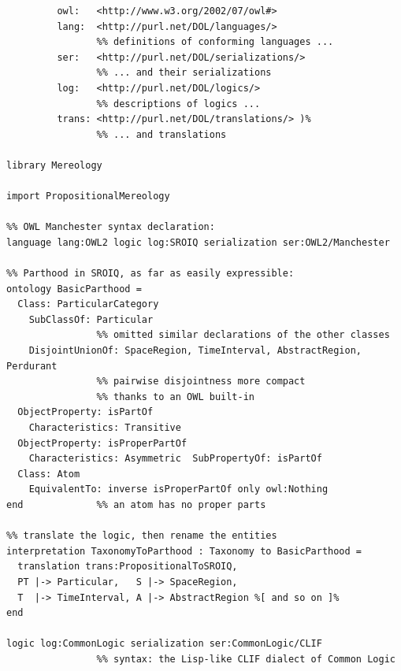 \documentclass[10pt, a4paper]{isov2}
\begin{document}

\label{dist-het-onto}
\begin{lstlisting}[basicstyle=\ttfamily,language=dolText,alsolanguage=owl2Manchester,alsolanguage=clif,escapechar=@,mathescape]
%prefix( :      <http://www.example.org/mereology#>
         owl:   <http://www.w3.org/2002/07/owl#>
         lang:  <http://purl.net/DOL/languages/>
                %% definitions of conforming languages ...
         ser:   <http://purl.net/DOL/serializations/>
                %% ... and their serializations
         log:   <http://purl.net/DOL/logics/>
                %% descriptions of logics ...
         trans: <http://purl.net/DOL/translations/> )%
                %% ... and translations

library Mereology

import PropositionalMereology

%% OWL Manchester syntax declaration: 
language lang:OWL2 logic log:SROIQ serialization ser:OWL2/Manchester           

%% Parthood in SROIQ, as far as easily expressible:
ontology BasicParthood =                             
  Class: ParticularCategory 
  	SubClassOf: Particular
                %% omitted similar declarations of the other classes
    DisjointUnionOf: SpaceRegion, TimeInterval, AbstractRegion, Perdurant
                %% pairwise disjointness more compact 
                %% thanks to an OWL built-in
  ObjectProperty: isPartOf        
  	Characteristics: Transitive
  ObjectProperty: isProperPartOf  
  	Characteristics: Asymmetric  SubPropertyOf: isPartOf 
  Class: Atom 
  	EquivalentTo: inverse isProperPartOf only owl:Nothing
end             %% an atom has no proper parts

%% translate the logic, then rename the entities
interpretation TaxonomyToParthood : Taxonomy to BasicParthood =
  translation trans:PropositionalToSROIQ,
  PT |-> Particular,   S |-> SpaceRegion,
  T  |-> TimeInterval, A |-> AbstractRegion %[ and so on ]%
end

logic log:CommonLogic serialization ser:CommonLogic/CLIF
                %% syntax: the Lisp-like CLIF dialect of Common Logic


\end{lstlisting}
\end{document}
